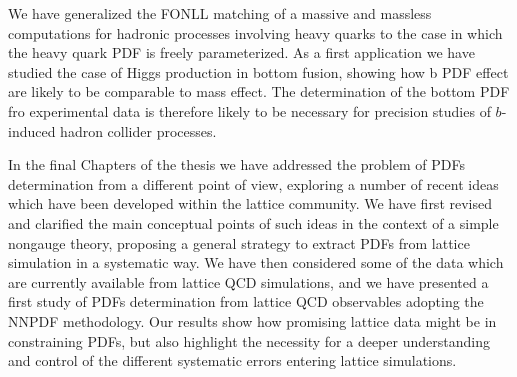 %
We have generalized the FONLL matching of a massive and massless computations for hadronic processes
involving heavy quarks to the case in which the heavy quark PDF is freely parameterized. 
As a first application we have studied the case of Higgs production in bottom fusion, showing how b PDF effect are likely
to be comparable to mass effect. The determination of the bottom PDF fro experimental data is therefore likely to be 
necessary for precision studies of $b$-induced hadron collider processes.

%
In the final Chapters of the thesis we have addressed the problem of PDFs determination from a different point of view,
exploring a number of recent ideas which have been developed within the lattice community.
We have first revised and clarified the main conceptual points of such ideas in the context of a simple nongauge theory,
proposing a general strategy to extract PDFs from lattice simulation in a systematic way.
We have then considered some of the data which are currently available from lattice QCD simulations, and we have presented
a first study of PDFs determination from lattice QCD observables adopting the NNPDF methodology.
Our results show how promising lattice data might be in constraining PDFs, but also highlight the necessity for a deeper
understanding and control of the different systematic errors entering lattice simulations.
